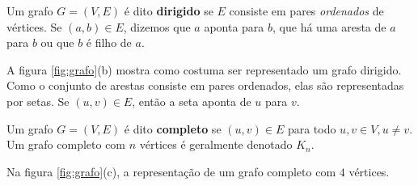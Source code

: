 \begin{definition}
  Um grafo $G = (V, E)$ é dito \textbf{dirigido} se $E$ consiste em pares \emph{ordenados} de vértices. Se $(a, b) \in E$, dizemos que $a$ aponta para $b$, que há uma aresta de $a$ para $b$ ou que $b$ é filho de $a$.

  A figura \ref{fig:grafo}(b) mostra como costuma ser representado um grafo dirigido. Como o conjunto de arestas consiste em pares ordenados, elas são representadas por setas. Se $(u, v) \in E$, então a seta aponta de $u$ para $v$.
\end{definition}

\begin{definition}
  Um grafo $G = (V, E)$ é dito \textbf{completo} se $(u, v) \in E$ para todo $u, v \in V, u \neq v$. Um grafo completo com $n$ vértices é geralmente denotado $K_n$.

  Na figura \ref{fig:grafo}(c), a representação de um grafo completo com $4$ vértices.
\end{definition}

